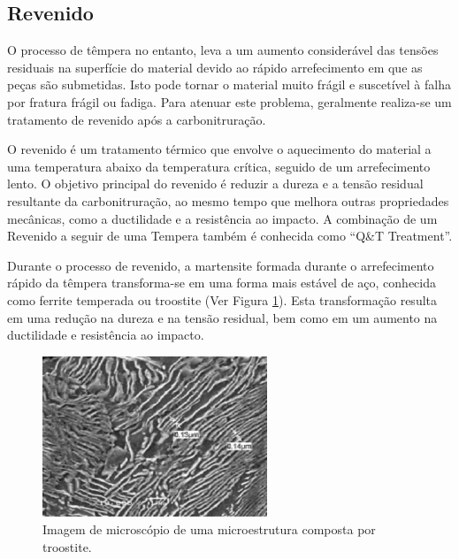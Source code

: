 \subsection{Revenido} \label{ssec:soa_tratamentos_revenido}

O processo de têmpera no entanto, leva a um aumento considerável das tensões residuais na superfície do material devido ao rápido arrefecimento em que as peças são submetidas. Isto pode tornar o material muito frágil e suscetível à falha por fratura frágil ou fadiga. Para atenuar este problema, geralmente realiza-se um tratamento de revenido após a carbonitruração.
\par
O revenido é um tratamento térmico que envolve o aquecimento do material a uma temperatura abaixo da temperatura crítica, seguido de um arrefecimento lento. O objetivo principal do revenido é reduzir a dureza e a tensão residual resultante da carbonitruração, ao mesmo tempo que melhora outras propriedades mecânicas, como a ductilidade e a resistência ao impacto\cite{Krauss2015}. A combinação de um Revenido a seguir de uma Tempera também é conhecida como “Q\&T Treatment”.
\par
Durante o processo de revenido, a martensite formada durante o arrefecimento rápido da têmpera transforma-se em uma forma mais estável de aço, conhecida como ferrite temperada ou troostite (Ver Figura \ref{fig:Troostite}). Esta transformação resulta em uma redução na dureza e na tensão residual, bem como em um aumento na ductilidade e resistência ao impacto\cite{Krauss2001}.
\begin{figure}[htb]
    \centering
    \includegraphics[width = 0.6\textwidth]{Figures/Cap2/Troostite.png}
    \caption[Microestrutura de Troostite]%
    {Imagem de microscópio de uma microestrutura composta por troostite\cite{Liu2011}.}
    \label{fig:Troostite}
\end{figure}
